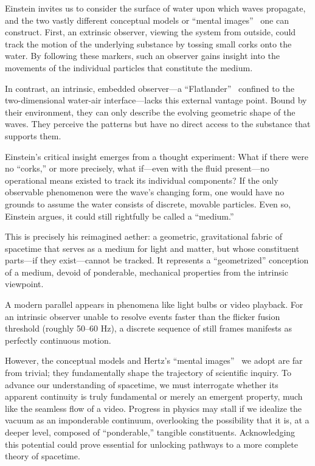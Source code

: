 \documentclass[%
  reprint,
  superscriptaddress,
  showpacs,
  showkeys,
  amsmath,amssymb,
  pra,
  longbibliography,
  floatfix,
  x11names
]{revtex4-2}
\begin{document}
Einstein invites us to consider the surface of water upon which waves propagate, and the two vastly different conceptual models or ``mental images''~\cite{hertz-94e} one can construct. First, an extrinsic observer, viewing the system from outside, could track the motion of the underlying substance by tossing small corks onto the water. By following these markers, such an observer gains insight into the movements of the individual particles that constitute the medium.

In contrast, an intrinsic, embedded observer---a ``Flatlander''~\cite{abbott-flatland} confined to the two-dimensional water-air interface---lacks this external vantage point. Bound by their environment, they can only describe the evolving geometric shape of the waves. They perceive the patterns but have no direct access to the substance that supports them.

Einstein's critical insight emerges from a thought experiment: What if there were no ``corks,'' or more precisely, what if---even with the fluid present---no operational means existed to track its individual components? If the only observable phenomenon were the wave's changing form, one would have no grounds to assume the water consists of discrete, movable particles. Even so, Einstein argues, it could still rightfully be called a ``medium.''

This is precisely his reimagined aether: a geometric, gravitational fabric of spacetime that serves as a medium for light and matter, but whose constituent parts---if they exist---cannot be tracked. It represents a ``geometrized'' conception of a medium, devoid of ponderable, mechanical properties from the intrinsic viewpoint.

A modern parallel appears in phenomena like light bulbs or video playback. For an intrinsic observer unable to resolve events faster than the flicker fusion threshold (roughly 50--60 Hz), a discrete sequence of still frames manifests as perfectly continuous motion.

However, the conceptual models and Hertz's ``mental images''~\cite{hertz-94e} we adopt are far from trivial; they fundamentally shape the trajectory of scientific inquiry. To advance our understanding of spacetime, we must interrogate whether its apparent continuity is truly fundamental or merely an emergent property, much like the seamless flow of a video. Progress in physics may stall if we idealize the vacuum as an imponderable continuum, overlooking the possibility that it is, at a deeper level, composed of ``ponderable,'' tangible constituents. Acknowledging this potential could prove essential for unlocking pathways to a more complete theory of spacetime.
\end{document}
